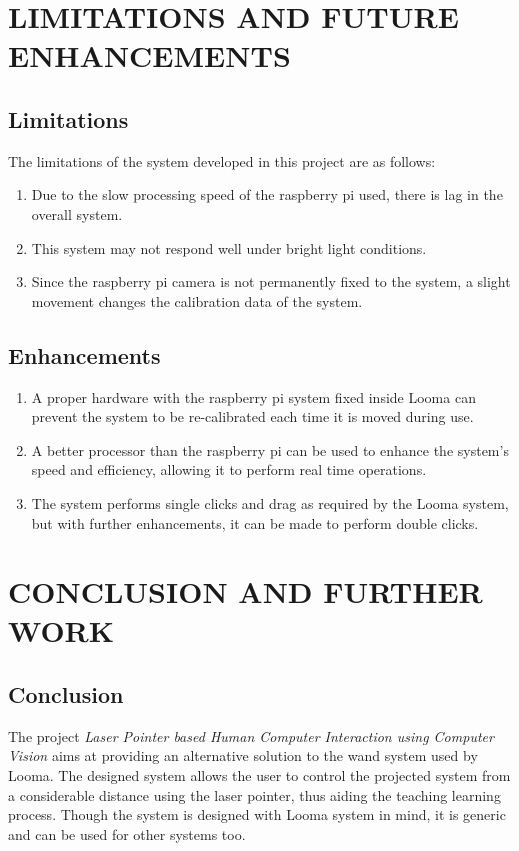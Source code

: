 \documentclass[12pt, a4paper]{article}
\begin{document}
\section{LIMITATIONS AND FUTURE ENHANCEMENTS}
\subsection{Limitations}

The limitations of the system developed in this project are as follows:

\begin{enumerate}
\item Due to the slow processing speed of the raspberry pi used, there is lag in the overall system. 
\item This system may not respond well under bright light conditions.
\item Since the raspberry pi camera is not permanently fixed to the system, a slight movement changes the calibration data of the system.

\end{enumerate}

\subsection{Enhancements}

\begin{enumerate}
\item A proper hardware with the raspberry pi system fixed inside Looma can prevent the system to be re-calibrated each time it is moved during use.
\item A better processor than the raspberry pi can be used to enhance the system’s speed and efficiency, allowing it to perform real time operations.
\item The system performs single clicks and drag as required by the Looma system, but with further enhancements, it can be made to perform double clicks.
\end{enumerate}
\newpage
\section{CONCLUSION AND FURTHER WORK}
\subsection{Conclusion}
The project \emph{Laser Pointer based Human Computer Interaction using Computer Vision} aims at providing an alternative solution to the wand system used by Looma. The designed system allows the user to control the projected system from a considerable distance using the laser pointer, thus aiding the teaching learning process. Though the system is designed with Looma system in mind, it is generic and can be used for other systems too.
\end{document}
